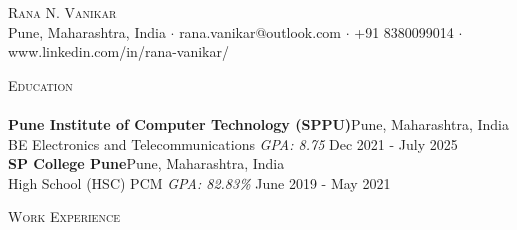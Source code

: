 \documentclass[a4paper]{article}
\newcommand{\lineunder} {
    \vspace*{-8pt} \\
    \hspace*{-18pt} \hrulefill \\
}
\newcommand{\header} [1] {
    {\hspace*{-18pt}\vspace*{6pt} \textsc{#1}}
    \vspace*{-6pt} \lineunder
}
\begin{document}
\vspace*{-40pt}

    

\vspace*{-10pt}
\begin{center}
	{\Huge \scshape {Rana N. Vanikar}}\\
	Pune, Maharashtra, India $\cdot$ rana.vanikar@outlook.com $\cdot$ +91 8380099014 $\cdot$ www.linkedin.com/in/rana-vanikar/\\
\end{center}

\header{Education}
\textbf{Pune Institute of Computer Technology (SPPU)}\hfill Pune, Maharashtra, India\\
BE Electronics and Telecommunications \textit{GPA: 8.75} \hfill Dec 2021 - July 2025\\
\vspace{2mm}
\textbf{SP College Pune}\hfill Pune, Maharashtra, India\\
High School (HSC) PCM \textit{GPA: 82.83\%} \hfill June 2019 - May 2021\\
\vspace{2mm}

\header{Work Experience}
\vspace{1mm}
\end{document}
